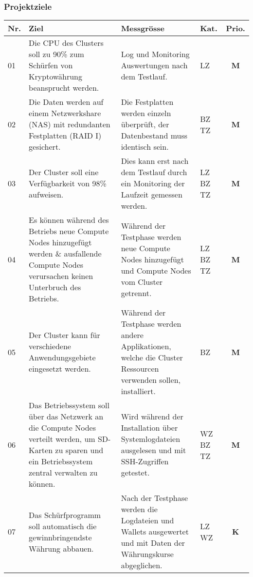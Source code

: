 \newpage
\subsubsection{Projektziele} 
\label{sec:Projektziele}

\begin{table}[H]
\begin{tabular}[t]{p{0.7cm}|p{6.1cm}p{6.1cm} >{\centering}p{0.6cm}c}
\hline
\rowcolor{heading}\textbf{Nr.} & \textbf{Ziel} & \textbf{Messgrösse} & \textbf{Kat.} & \textbf{Prio.} \\\hline
01 & Die CPU des Clusters soll zu 90\% zum Schürfen von Kryptowährung  beansprucht werden. & Log und Monitoring Auswertungen nach dem Testlauf. & LZ & \textbf{M} \\\hline
02 & Die Daten werden auf einem Netzwerkshare (NAS) mit redundanten Festplatten (RAID I) gesichert. & Die Festplatten werden einzeln überprüft, der Datenbestand muss identisch sein. & BZ \newline TZ & \textbf{M} \\\hline
03 & Der Cluster soll eine Verfügbarkeit von 98\% aufweisen. & Dies kann erst nach dem Testlauf durch ein Monitoring der Laufzeit gemessen werden. & LZ \newline BZ \newline TZ & \textbf{M} \\\hline
04 & Es können während des Betriebs neue Compute Nodes hinzugefügt werden \& ausfallende Compute Nodes verursachen keinen Unterbruch des Betriebs. & Während der Testphase werden neue Compute Nodes hinzugefügt und Compute Nodes vom Cluster getrennt.  & LZ \newline BZ \newline TZ & \textbf{M} \\\hline 
05 & Der Cluster kann für verschiedene Anwendungsgebiete eingesetzt werden. & Während der Testphase werden andere Applikationen, welche die Cluster Ressourcen verwenden sollen, installiert. & BZ & \textbf{M} \\\hline
06 & Das Betriebssystem soll über das Netzwerk an die Compute Nodes verteilt werden, um SD-Karten zu sparen und ein Betriebssystem zentral verwalten zu können. & Wird während der Installation über Systemlogdateien ausgelesen und mit SSH-Zugriffen getestet. & WZ \newline BZ \newline TZ & \textbf{M} \\\hline
07 & Das Schürfprogramm soll automatisch die gewinnbringendste Währung abbauen. & Nach der Testphase werden die Logdateien und Wallets ausgewertet und mit Daten der Währungskurse abgeglichen. & LZ \newline WZ & \textbf{K} \\\hline

\end{tabular}
\end{table}
